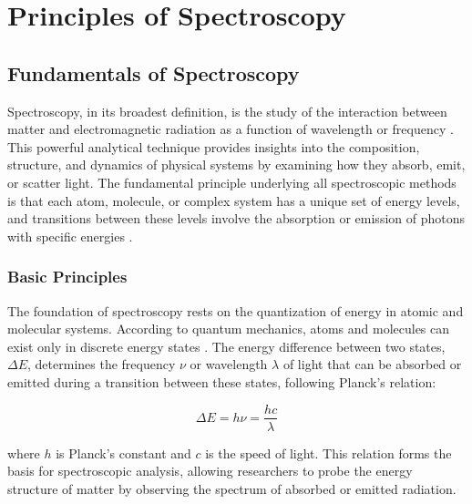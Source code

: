 
\chapter{Principles of Spectroscopy} %

\label{chap:spectroscopy} %


\section{Fundamentals of Spectroscopy}
\label{sec:spectroscopy_fundamentals}

\noindent Spectroscopy, in its broadest definition, is the study of the interaction between matter and electromagnetic radiation as a function of wavelength or frequency \cite{Mukamel1995}. This powerful analytical technique provides insights into the composition, structure, and dynamics of physical systems by examining how they absorb, emit, or scatter light. The fundamental principle underlying all spectroscopic methods is that each atom, molecule, or complex system has a unique set of energy levels, and transitions between these levels involve the absorption or emission of photons with specific energies \cite{Boyd2008}.

\subsection{Basic Principles}
\label{subsec:basic_principles}

\noindent The foundation of spectroscopy rests on the quantization of energy in atomic and molecular systems. According to quantum mechanics, atoms and molecules can exist only in discrete energy states \cite{albashQuantumAdiabaticMarkovian2012}. The energy difference between two states, $\Delta E$, determines the frequency $\nu$ or wavelength $\lambda$ of light that can be absorbed or emitted during a transition between these states, following Planck's relation:

\begin{equation}
    \Delta E = h\nu = \frac{hc}{\lambda}
    \label{eq:planck_relation}
\end{equation}

\noindent where $h$ is Planck's constant and $c$ is the speed of light. This relation forms the basis for spectroscopic analysis, allowing researchers to probe the energy structure of matter by observing the spectrum of absorbed or emitted radiation.

